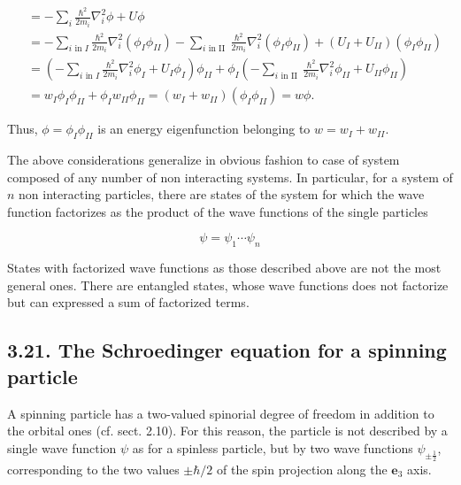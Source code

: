 \documentclass{article}
\begin{document}
\begin{align*}
& =-\sum_{i} \frac{\hbar^{2}}{2 m_{i}} \nabla_{i}^{2} \phi+U \phi  \tag{3.20.29}\\
& =-\sum_{i \text { in } I} \frac{\hbar^{2}}{2 m_{i}} \nabla_{i}^{2}\left(\phi_{I} \phi_{I I}\right)-\sum_{i \text { in II }} \frac{\hbar^{2}}{2 m_{i}} \nabla_{i}^{2}\left(\phi_{I} \phi_{I I}\right)+\left(U_{I}+U_{I I}\right)\left(\phi_{I} \phi_{I I}\right) \\
& =\left(-\sum_{i \text { in } I} \frac{\hbar^{2}}{2 m_{i}} \nabla_{i}^{2} \phi_{I}+U_{I} \phi_{I}\right) \phi_{I I}+\phi_{I}\left(-\sum_{i \text { in II }} \frac{\hbar^{2}}{2 m_{i}} \nabla_{i}^{2} \phi_{I I}+U_{I I} \phi_{I I}\right) \\
& =w_{I} \phi_{I} \phi_{I I}+\phi_{I} w_{I I} \phi_{I I}=\left(w_{I}+w_{I I}\right)\left(\phi_{I} \phi_{I I}\right)=w \phi .
\end{align*}
 

Thus, $\phi=\phi_{I} \phi_{I I}$ is an energy eigenfunction belonging to $w=w_{I}+w_{I I}$.

The above considerations generalize in obvious fashion to case of system composed of any number of non interacting systems. In particular, for a system of $n$ non interacting particles, there are states of the system for which the wave function factorizes as the product of the wave functions of the single particles
 
\begin{equation*}
\psi=\psi_{1} \cdots \psi_{n} \tag{3.20.30}
\end{equation*}
 

States with factorized wave functions as those described above are not the most general ones. There are entangled states, whose wave functions does not factorize but can expressed a sum of factorized terms.

\subsection*{3.21. The Schroedinger equation for a spinning particle}

A spinning particle has a two-valued spinorial degree of freedom in addition to the orbital ones (cf. sect. 2.10). For this reason, the particle is not described by a single wave function $\psi$ as for a spinless particle, but by two wave functions $\psi_{ \pm \frac{1}{2}}$, corresponding to the two values $\pm \hbar / 2$ of the spin projection along the $\boldsymbol{e}_{3}$ axis.
\end{document}
